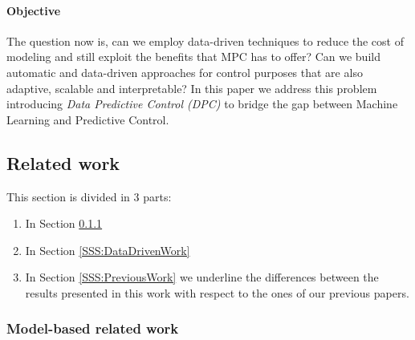 \paragraph{Objective} The question now is, can we employ data-driven techniques to reduce the cost of modeling and still exploit the benefits that MPC has to offer? Can we build automatic and data-driven approaches for control purposes that are also adaptive, scalable and interpretable? In this paper we address this problem introducing \textit{Data Predictive Control (DPC)} to bridge the gap between Machine Learning and Predictive Control.
\textcolor[rgb]{0,0,1}{
\subsection{Related work}
This section is divided in 3 parts:
\begin{enumerate}
	\item In Section \ref{SSS:ModelBasedWork}
	\item In Section \ref{SSS:DataDrivenWork}
	\item In Section \ref{SSS:PreviousWork} we underline the differences between the results presented in this work with respect to the ones of our previous papers.
\end{enumerate}
\subsubsection{Model-based related work}\label{SSS:ModelBasedWork}
}
